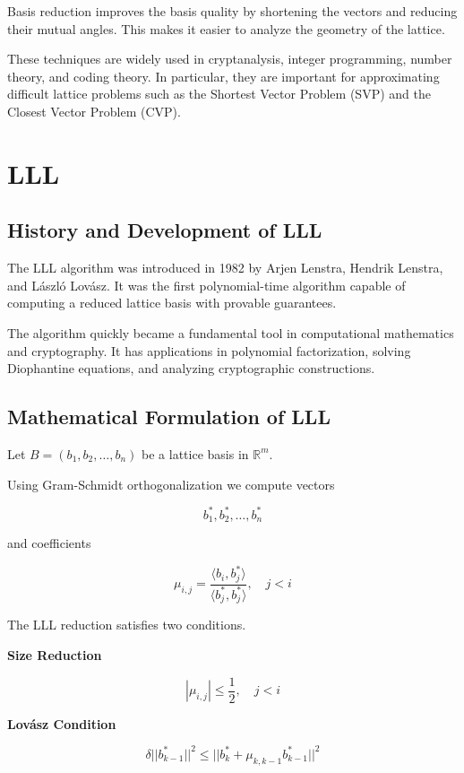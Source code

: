 \documentclass[12pt, a4paper]{article}
\theoremstyle{definition}
\theoremstyle{plain}
\begin{document}
Basis reduction improves the basis quality by shortening the vectors and reducing their mutual angles. This makes it easier to analyze the geometry of the lattice.

These techniques are widely used in cryptanalysis, integer programming, number theory, and coding theory. In particular, they are important for approximating difficult lattice problems such as the Shortest Vector Problem (SVP) and the Closest Vector Problem (CVP).

\section{LLL}

\subsection{History and Development of LLL}

The LLL algorithm was introduced in 1982 by Arjen Lenstra, Hendrik Lenstra, and László Lovász. It was the first polynomial-time algorithm capable of computing a reduced lattice basis with provable guarantees.

The algorithm quickly became a fundamental tool in computational mathematics and cryptography. It has applications in polynomial factorization, solving Diophantine equations, and analyzing cryptographic constructions.

\subsection{Mathematical Formulation of LLL}

Let $B=(b_1,b_2,\dots,b_n)$ be a lattice basis in $\mathbb{R}^m$.

Using Gram-Schmidt orthogonalization we compute vectors

\[
b_1^*,b_2^*,\dots,b_n^*
\]

and coefficients

\[
\mu_{i,j}=\frac{\langle b_i,b_j^*\rangle}{\langle b_j^*,b_j^*\rangle}, \quad j<i
\]

The LLL reduction satisfies two conditions.

\textbf{Size Reduction}

\[
|\mu_{i,j}| \le \frac{1}{2}, \quad j<i
\]

\textbf{Lovász Condition}

\[
\delta ||b_{k-1}^*||^2 \le ||b_k^*+\mu_{k,k-1}b_{k-1}^*||^2
\]
\end{document}
